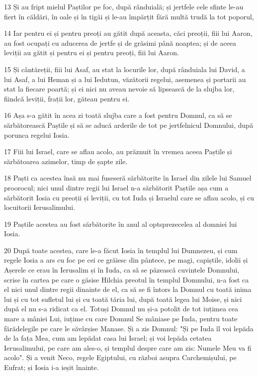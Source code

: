 \par 13 Și au fript mielul Paștilor pe foc, după rânduială; și jertfele cele sfinte le-au fiert în căldări, în oale și în tigăi și le-au împărțit fără multă trudă la tot poporul,
\par 14 Iar pentru ei și pentru preoți au gătit după aceasta, căci preoții, fiii lui Aaron, au fost ocupați cu aducerea de jertfe și de grăsimi până noaptea; și de aceea leviții au gătit și pentru ei și pentru preoți, fiii lui Aaron.
\par 15 Și cântăreții, fiii lui Asaf, au stat la locurile lor, după rânduiala lui David, a lui Asaf, a lui Heman și a lui Iedutun, văzătorii regelui, asemenea și portarii au stat la fiecare poartă; și ei nici nu aveau nevoie să lipsească de la slujba lor, fiindcă leviții, frații lor, găteau pentru ei.
\par 16 Așa s-a gătit în acea zi toată slujba care a fost pentru Domnul, ca să se sărbătorească Paștile și să se aducă arderile de tot pe jertfelnicul Domnului, după porunca regelui Iosia.
\par 17 Fiii lui Israel, care se aflau acolo, au prăznuit în vremea aceea Paștile și sărbătoarea azimelor, timp de șapte zile.
\par 18 Paști ca acestea însă nu mai fuseseră sărbătorite în Israel din zilele lui Samuel proorocul; nici unul dintre regii lui Israel n-a sărbătorit Paștile așa cum a sărbătorit Iosia cu preoții și leviții, cu tot Iuda și Israelul care se aflau acolo, și cu locuitorii Ierusalimului.
\par 19 Paștile acestea au fost sărbătorite în anul al optsprezecelea al domniei lui Iosia.
\par 20 După toate acestea, care le-a făcut Iosia în templul lui Dumnezeu, și cum regele Iosia a ars cu foc pe cei ce grăiesc din pântece, pe magi, capiștile, idolii și Așerele ce erau în Ierusalim și în Iuda, ca să se păzească cuvintele Domnului, scrise în cartea pe care o găsise Hilchia preotul în templul Domnului, n-a fost ca el nici unul dintre regii dinainte de el, ca să se fi întors la Domnul cu toată inima lui și cu tot sufletul lui și cu toată tăria lui, după toată legea lui Moise, și nici după el nu s-a ridicat ca el. Totuși Domnul nu și-a potolit de tot iuțimea cea mare a mâniei Lui, iuțime cu care Domnul Se mâniase pe Iuda, pentru toate fărădelegile pe care le săvârșise Manase. Și a zis Domnul: "Și pe Iuda îl voi lepăda de la fața Mea, cum am lepădat casa lui Israel; și voi lepăda cetatea Ierusalimului, pe care am ales-o, și templul despre care am zis: Numele Meu va fi acolo". Și a venit Neco, regele Egiptului, cu război asupra Carchemișului, pe Eufrat; și Iosia i-a ieșit înainte.
